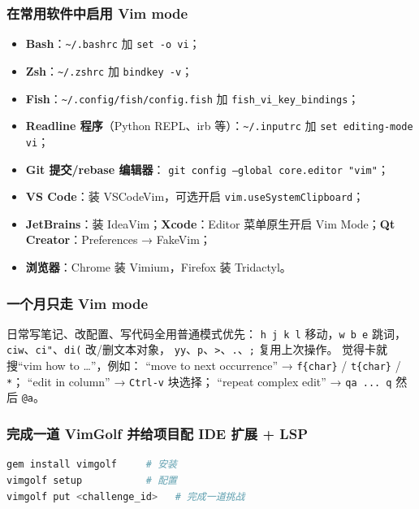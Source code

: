 \documentclass[a4paper,11pt]{ctexart}
\begin{document}
\subsubsection{在常用软件中启用 Vim mode}

\begin{itemize}
  \item \textbf{Bash}：\texttt{\textasciitilde/.bashrc} 加 \texttt{set -o vi}；
  \item \textbf{Zsh}：\texttt{\textasciitilde/.zshrc} 加 \texttt{bindkey -v}；
  \item \textbf{Fish}：\texttt{\textasciitilde/.config/fish/config.fish} 加
        \texttt{fish\_vi\_key\_bindings}；
  \item \textbf{Readline 程序}（Python REPL、irb 等）：\texttt{\textasciitilde/.inputrc} 加
        \texttt{set editing-mode vi}；
  \item \textbf{Git 提交/rebase 编辑器}：
        \texttt{git config --global core.editor "vim"}；
  \item \textbf{VS Code}：装 VSCodeVim，可选开启 \texttt{vim.useSystemClipboard}；
  \item \textbf{JetBrains}：装 IdeaVim；\textbf{Xcode}：Editor 菜单原生开启
        Vim Mode；\textbf{Qt Creator}：Preferences → FakeVim；
  \item \textbf{浏览器}：Chrome 装 Vimium，Firefox 装 Tridactyl。
\end{itemize}

\subsubsection{一个月只走 Vim mode}

日常写笔记、改配置、写代码全用普通模式优先：
\texttt{h j k l} 移动，\texttt{w b e} 跳词，
\texttt{ciw}、\texttt{ci"}、\texttt{di(} 改/删文本对象，
\texttt{yy}、\texttt{p}、\texttt{>}、\texttt{.}、\texttt{;} 复用上次操作。
觉得卡就搜``vim how to \ldots''，例如：
``move to next occurrence'' → \texttt{f\{char\}} / \texttt{t\{char\}} / \texttt{*}；
``edit in column'' → \texttt{Ctrl-v} 块选择；
``repeat complex edit'' → \texttt{qa ... q} 然后 \texttt{@a}。

\subsubsection{完成一道 VimGolf 并给项目配 IDE 扩展 + LSP}

\begin{lstlisting}[language=bash]
gem install vimgolf     # 安装
vimgolf setup           # 配置
vimgolf put <challenge_id>   # 完成一道挑战
\end{lstlisting}
\end{document}
